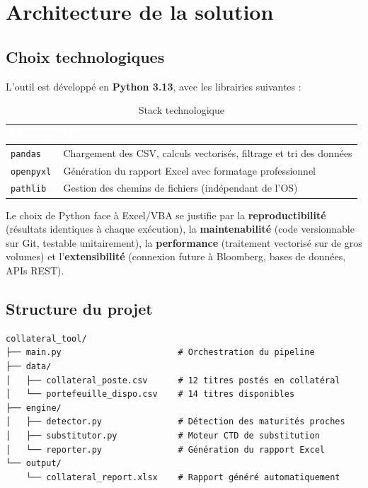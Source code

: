 \documentclass[12pt,a4paper]{article}
\begin{document}
\newpage
\section{Architecture de la solution}

\subsection{Choix technologiques}

L'outil est développé en \textbf{Python 3.13}, avec les librairies suivantes :

\begin{table}[H]
\centering
\renewcommand{\arraystretch}{1.3}
\begin{tabularx}{\linewidth}{p{3cm} X}
\toprule
\rowcolor{natixisBlue}
\textcolor{white}{\textbf{Librairie}} &
\textcolor{white}{\textbf{Rôle}} \\
\midrule
\texttt{pandas} & Chargement des CSV, calculs vectorisés, filtrage et tri des données \\
\rowcolor{natixisGray}
\texttt{openpyxl} & Génération du rapport Excel avec formatage professionnel \\
\texttt{pathlib} & Gestion des chemins de fichiers (indépendant de l'OS) \\
\bottomrule
\end{tabularx}
\caption{Stack technologique}
\end{table}

Le choix de Python face à Excel/VBA se justifie par la \textbf{reproductibilité}
(résultats identiques à chaque exécution), la \textbf{maintenabilité} (code versionnable
sur Git, testable unitairement), la \textbf{performance} (traitement vectorisé sur de
gros volumes) et l'\textbf{extensibilité} (connexion future à Bloomberg, bases de données,
APIs REST).

\subsection{Structure du projet}

\begin{lstlisting}[language={},numbers=none,frame=none,backgroundcolor=\color{natixisGray}]
collateral_tool/
├── main.py                       # Orchestration du pipeline
├── data/
│   ├── collateral_poste.csv      # 12 titres postés en collatéral
│   └── portefeuille_dispo.csv    # 14 titres disponibles
├── engine/
│   ├── detector.py               # Détection des maturités proches
│   ├── substitutor.py            # Moteur CTD de substitution
│   └── reporter.py               # Génération du rapport Excel
└── output/
    └── collateral_report.xlsx    # Rapport généré automatiquement
\end{lstlisting}
\end{document}
